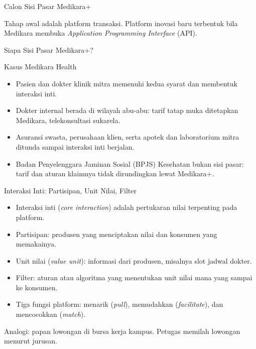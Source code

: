 \documentclass[aspectratio=169, table, 12pt]{beamer}
\begin{document}
\begin{frame}{{\Large Calon Sisi Pasar Medikara+}}
  \centering
  \resizebox{!}{0.62\textheight}{}

  \vspace{2pt}
  {\footnotesize Tahap awal adalah platform transaksi. Platform inovasi baru terbentuk bila Medikara membuka \textit{Application Programming Interface} (API).\par}
\end{frame}

\begin{frame}{{\Large Siapa Sisi Pasar Medikara+?}}
  \begin{block}{Kasus Medikara Health}
    \small
    \begin{itemize}
      \item Pasien dan dokter klinik mitra memenuhi kedua syarat dan membentuk interaksi inti.
      \item Dokter internal berada di wilayah abu-abu: tarif tatap muka ditetapkan Medikara, telekonsultasi sukarela.
      \item Asuransi swasta, perusahaan klien, serta apotek dan laboratorium mitra ditunda sampai interaksi inti berjalan.
      \item Badan Penyelenggara Jaminan Sosial (BPJS) Kesehatan bukan sisi pasar: tarif dan aturan klaimnya tidak dirundingkan lewat Medikara+.
    \end{itemize}
  \end{block}
\end{frame}

\begin{frame}{{\Large Interaksi Inti: Partisipan, Unit Nilai, Filter}}
  \begin{itemize}
    \item Interaksi inti (\textit{core interaction}) adalah pertukaran nilai terpenting pada platform.
    \item Partisipan: produsen yang menciptakan nilai dan konsumen yang memakainya.
    \item Unit nilai (\textit{value unit}): informasi dari produsen, misalnya slot jadwal dokter.
    \item Filter: aturan atau algoritma yang menentukan unit nilai mana yang sampai ke konsumen.
    \item Tiga fungsi platform: menarik (\textit{pull}), memudahkan (\textit{facilitate}), dan mencocokkan (\textit{match}).
  \end{itemize}
  \vspace{2pt}
  {\footnotesize Analogi: papan lowongan di bursa kerja kampus. Petugas memilah lowongan menurut jurusan.\par}
\end{frame}
\end{document}
